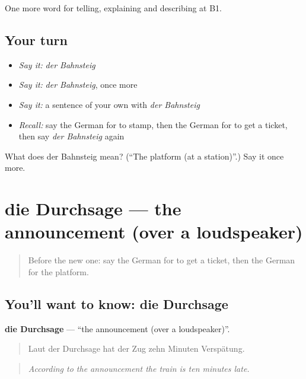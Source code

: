 \begin{grammarlens}[title={What you've built}]
One more word for telling, explaining and describing at B1.
\end{grammarlens}

\subsection*{Your turn}
\begin{itemize}
\raggedright
  \item \emph{Say it:} \emph{der Bahnsteig}
  \item \emph{Say it:} \emph{der Bahnsteig}, once more
  \item \emph{Say it:} a sentence of your own with \emph{der Bahnsteig}
  \item \emph{Recall:} say the German for to stamp, then the German for to get a ticket, then say \emph{der Bahnsteig} again
\end{itemize}

\begin{tcolorbox}[breakable,colback=teal!4,colframe=teal!35!black,title={Before you move on}]
What does der Bahnsteig mean? (\textquotedblleft{}The platform (at a station)\textquotedblright{}.) Say it once more.
\end{tcolorbox}
\section[die Durchsage]{die Durchsage — the announcement (over a loudspeaker)}

\label{lesson:GE-C412-durchsage}



\begin{quote}
Before the new one: say the German for to get a ticket, then the German for the platform.
\end{quote}

\subsection*{You'll want to know: die Durchsage}
\textbf{die Durchsage} — \textquotedblleft{}the announcement (over a loudspeaker)\textquotedblright{}.

\begin{quote}
Laut der Durchsage hat der Zug zehn Minuten Verspätung.
\end{quote}

\begin{quote}
\emph{According to the announcement the train is ten minutes late.}
\end{quote}

